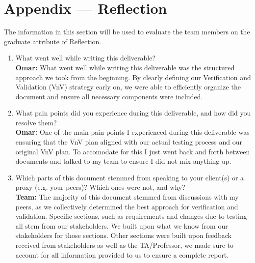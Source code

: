 \documentclass[12pt, titlepage]{article}
\begin{document}
\newpage{}
\section*{Appendix --- Reflection}

The information in this section will be used to evaluate the team members on the
graduate attribute of Reflection.



\begin{enumerate}
  \item What went well while writing this deliverable? \\
  \textbf{Omar:} What went well while writing this deliverable was the structured approach we took from the beginning. By clearly defining our Verification and Validation (VnV) strategy early on, we were able to efficiently organize the document and ensure all necessary components were included. 

  \item What pain points did you experience during this deliverable, and how
    did you resolve them? \\
    \textbf{Omar:} One of the main pain points I experienced during this deliverable was ensuring that the VnV plan aligned with our actual testing process and our original VnV plan. To accomodate for this I just went back and forth between documents and talked to my team to ensure I did not mix anything up.

  \item Which parts of this document stemmed from speaking to your client(s) or
  a proxy (e.g. your peers)? Which ones were not, and why? \\
    \textbf{Team:} The majority of this document stemmed from discussions with my peers, as we collectively determined the best approach for verification and validation. Specific sections, such as requirements and changes due to testing all stem from our stakeholders. We built upon what we know from our stakeholders for those sections. Other sections were built upon feedback received from stakeholders as well as the TA/Professor, we made sure to account for all information provided to us to ensure a complete report. 


\end{enumerate}
\end{document}
